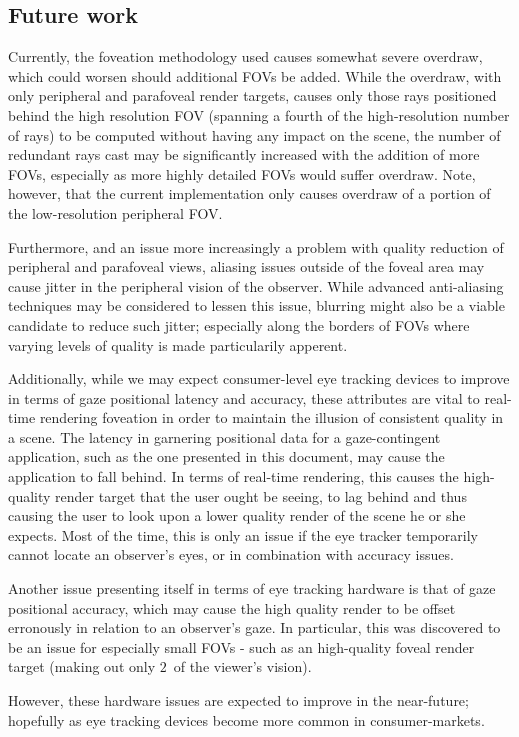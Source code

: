 \subsection{Future work}
Currently, the foveation methodology used causes somewhat severe overdraw, which could worsen should additional FOVs be added.
While the overdraw, with only peripheral and parafoveal render targets, causes only those rays positioned behind the high resolution FOV (spanning a fourth of the high-resolution number of rays) to be computed without having any impact on the scene, the number of redundant rays cast may be significantly increased with the addition of more FOVs, especially as more highly detailed FOVs would suffer overdraw.
Note, however, that the current implementation only causes overdraw of a portion of the low-resolution peripheral FOV.

Furthermore, and an issue more increasingly a problem with quality reduction of peripheral and parafoveal views, aliasing issues outside of the foveal area may cause jitter in the peripheral vision of the observer.
While advanced anti-aliasing techniques may be considered to lessen this issue, blurring might also be a viable candidate to reduce such jitter; especially along the borders of FOVs where varying levels of quality is made particularily apperent.

Additionally, while we may expect consumer-level eye tracking devices to improve in terms of gaze positional latency and accuracy, these attributes are vital to real-time rendering foveation in order to maintain the illusion of consistent quality in a scene.
The latency in garnering positional data for a gaze-contingent application, such as the one presented in this document, may cause the application to fall behind.
In terms of real-time rendering, this causes the high-quality render target that the user ought be seeing, to lag behind and thus causing the user to look upon a lower quality render of the scene he or she expects.
Most of the time, this is only an issue if the eye tracker temporarily cannot locate an observer's eyes, or in combination with accuracy issues.

Another issue presenting itself in terms of eye tracking hardware is that of gaze positional accuracy, which may cause the high quality render to be offset erronously in relation to an observer's gaze.
In particular, this was discovered to be an issue for especially small FOVs - such as an high-quality foveal render target (making out only $2$\degree\ of the viewer's vision).

However, these hardware issues are expected to improve in the near-future; hopefully as eye tracking devices become more common in consumer-markets.
